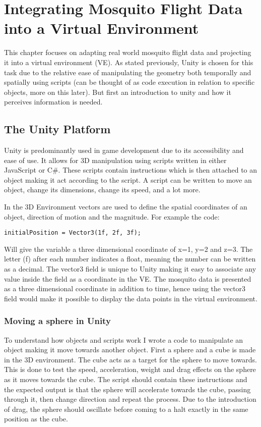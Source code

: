 \chapter{Integrating Mosquito Flight Data into a Virtual Environment}

This chapter focuses on adapting real world mosquito flight data and projecting it into a virtual environment (VE). As stated previously, Unity is chosen for this task due to the relative ease of manipulating the geometry both temporally and spatially using scripts (can be thought of as code execution in relation to specific objects, more on this later). But first an introduction to unity and how it perceives information is needed.

\section{The Unity Platform}
Unity is predominantly used in game development due to its accessibility and ease of use. It allows for 3D manipulation using scripts written in either JavaScript or C\#. These scripts contain instructions which is then attached to an object making it act according to the script. A script can be written to move an object, change its dimensions, change its speed, and a lot more. 

In the 3D Environment vectors are used to define the spatial coordinates of an object, direction of motion and the magnitude. For example the code:

\begin{verbatim}
initialPosition = Vector3(1f, 2f, 3f);
\end{verbatim}

Will give the variable  a three dimensional coordinate of x=1, y=2 and z=3. The letter (f) after each number indicates a float, meaning the number can be written as a decimal. The vector3 field  is unique to Unity making it easy to associate any value inside the field as a coordinate in the VE. The mosquito data is presented as a three dimensional coordinate in addition to time, hence using the vector3 field would make it possible to display the data points in the virtual environment. 

\subsection{Moving a sphere in Unity}
To understand how objects and scripts work I wrote a code to manipulate an object making it move towards another object. First a sphere and a cube is made in the 3D environment. The cube acts as a target for the sphere to move towards. This is done to test the speed, acceleration, weight and drag effects on the sphere as it moves towards the cube. The script should contain these instructions and the expected output is that the sphere will accelerate towards the cube, passing through it, then change direction and repeat the process. Due to the introduction of drag, the sphere should oscillate before coming to a halt exactly in the same position as the cube.

